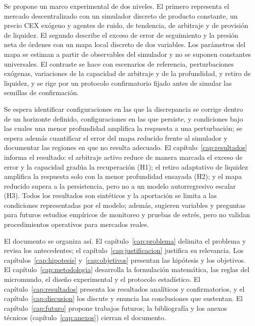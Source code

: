 Se propone un marco experimental de dos niveles. El primero representa el mercado descentralizado con un simulador discreto de producto constante, un precio CEX exógeno y agentes de ruido, de tendencia, de arbitraje y de provisión de liquidez. El segundo describe el exceso de error de seguimiento y la presión neta de órdenes con un mapa local discreto de dos variables. Los parámetros del mapa se estiman a partir de observables del simulador y no se suponen constantes universales. El contraste se hace con escenarios de referencia, perturbaciones exógenas, variaciones de la capacidad de arbitraje y de la profundidad, y retiro de liquidez, y se rige por un protocolo confirmatorio fijado antes de simular las semillas de confirmación.

Se espera identificar configuraciones en las que la discrepancia se corrige dentro de un horizonte definido, configuraciones en las que persiste, y condiciones bajo las cuales una menor profundidad amplifica la respuesta a una perturbación; se espera además cuantificar el error del mapa reducido frente al simulador y documentar las regiones en que no resulta adecuado. El capítulo~\ref{cap:resultados} informa el resultado: el arbitraje activo reduce de manera marcada el exceso de error y la capacidad gradúa la recuperación (H1); el retiro adaptativo de liquidez amplifica la respuesta solo con la menor profundidad ensayada (H2); y el mapa reducido supera a la persistencia, pero no a un modelo autorregresivo escalar (H3). Todos los resultados son sintéticos y la aportación se limita a las condiciones representadas por el modelo; además, sugieren variables y preguntas para futuros estudios empíricos de monitoreo y pruebas de estrés, pero no validan procedimientos operativos para mercados reales.

El documento se organiza así. El capítulo~\ref{cap:problema} delimita el problema y revisa los antecedentes; el capítulo~\ref{cap:justificacion} justifica su relevancia. Los capítulos~\ref{cap:hipotesis} y~\ref{cap:objetivos} presentan las hipótesis y los objetivos. El capítulo~\ref{cap:metodologia} desarrolla la formulación matemática, las reglas del micromundo, el diseño experimental y el protocolo estadístico. El capítulo~\ref{cap:resultados} presenta los resultados analíticos y confirmatorios, y el capítulo~\ref{cap:discusion} los discute y enuncia las conclusiones que sustentan. El capítulo~\ref{cap:futuro} propone trabajos futuros; la bibliografía y los anexos técnicos (capítulo~\ref{cap:anexos}) cierran el documento.
